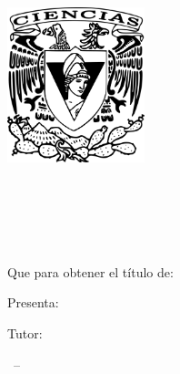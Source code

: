 
  
\begin{titlepage}
\AddToShipoutPicture*{\BackgroundPic}



\begin{addmargin}[-1cm]{-1cm}
\begin{center}
        \large

       \vspace{2cm}
        \includegraphics[width=4.0cm]{gfx/Escudo-FCIENCIAS.pdf} \\ \medskip
        \begingroup
            \spacedallcaps{\myUni} \\ \bigskip
        \endgroup
        
        \vfil
        
        \begingroup
            \spacedallcaps{\myFaculty} \\ \bigskip
        \endgroup
        
        \hfill

        \vfill
        
        \begingroup
            \color{CTtitle}\spacedallcaps{\myTitle} \\ \bigskip
        \endgroup
        \vfill
        \\[1.2cm]
        
        Que para obtener el título de: \\ \bigskip
        \myDegree

        \vspace{1.4cm}
        Presenta: \\ \bigskip
        \large{\spacedlowsmallcaps{\myName}}

        \vfill

        Tutor: \\ \bigskip
        \mySupervisor

      
        \vfill
        \myTime\ -- \myVersion

        \vfill

\end{center}

\end{addmargin}
\end{titlepage}
